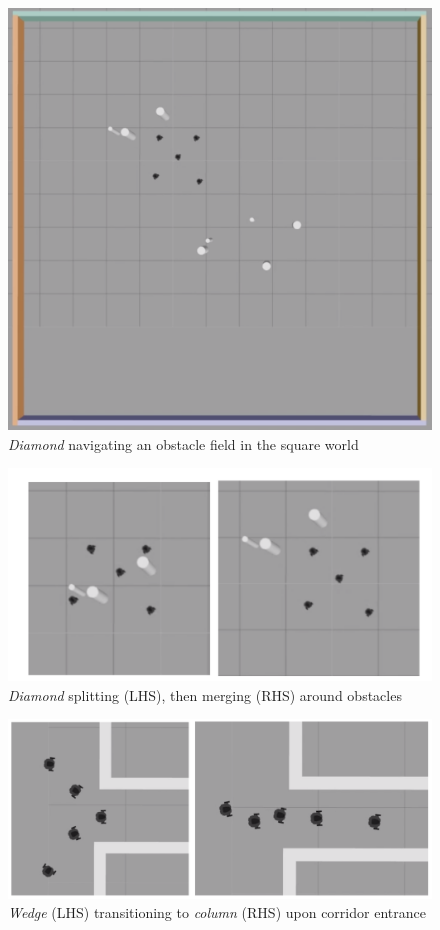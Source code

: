 \documentclass[letterpaper, 10 pt, conference]{ieeeconf}  %
\begin{document}
\begin{figure}[tb]	
\centering	
\includegraphics[width=0.7\linewidth]{images/square.png}	
\caption{\textit{Diamond} navigating an obstacle field in the square world}	
\label{fig:square}	
\end{figure}

\begin{figure}[tb]
\centering	
\includegraphics[width=0.8\linewidth]{images/split_merge.png}	
\caption{\textit{Diamond} splitting (LHS), then merging (RHS) around obstacles}	
\label{fig:split_merge}	
\end{figure}

\begin{figure}[tb]
\centering	
\includegraphics[width=0.9\linewidth]{images/switch_formation.png}	
\caption{\textit{Wedge} (LHS) transitioning to \textit{column} (RHS) upon corridor entrance}	
\label{fig:switch_formation}	
\end{figure}
\end{document}

